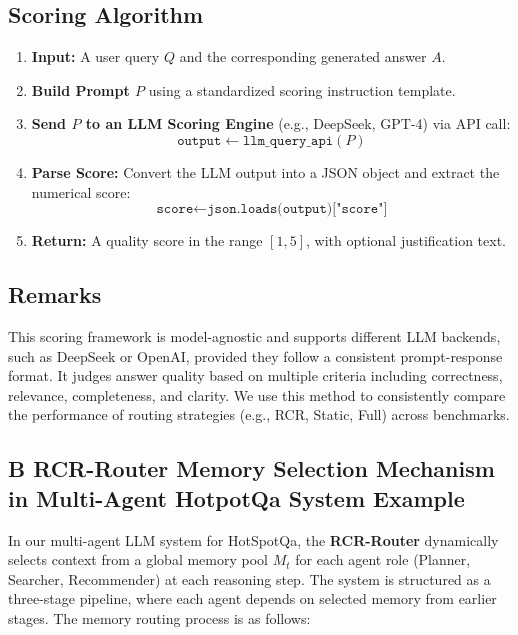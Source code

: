 \subsection*{Scoring Algorithm}

\begin{enumerate}
    \item \textbf{Input:} A user query $Q$ and the corresponding generated answer $A$.
    \item \textbf{Build Prompt $P$} using a standardized scoring instruction template.
    \item \textbf{Send $P$ to an LLM Scoring Engine} (e.g., DeepSeek, GPT-4) via API call:
    \[
        \texttt{output} \leftarrow \texttt{llm\_query\_api}(P)
    \]
    \item \textbf{Parse Score:} Convert the LLM output into a JSON object and extract the numerical score:
    \[
        \texttt{score} \leftarrow \texttt{json.loads(output)["score"]}
    \]
    \item \textbf{Return:} A quality score in the range $[1, 5]$, with optional justification text.
\end{enumerate}

\subsection*{Remarks}
This scoring framework is model-agnostic and supports different LLM backends, such as DeepSeek or OpenAI, provided they follow a consistent prompt-response format. It judges answer quality based on multiple criteria including correctness, relevance, completeness, and clarity. We use this method to consistently compare the performance of routing strategies (e.g., RCR, Static, Full) across benchmarks.




\subsection*{B \quad RCR-Router Memory Selection Mechanism in Multi-Agent HotpotQa System Example} \label{app:exp:mcprouter}

In our multi-agent LLM system for HotSpotQa, the \textbf{RCR-Router} dynamically selects context from a global memory pool $M_t$ for each agent role (Planner, Searcher, Recommender) at each reasoning step. The system is structured as a three-stage pipeline, where each agent depends on selected memory from earlier stages. The memory routing process is as follows:

